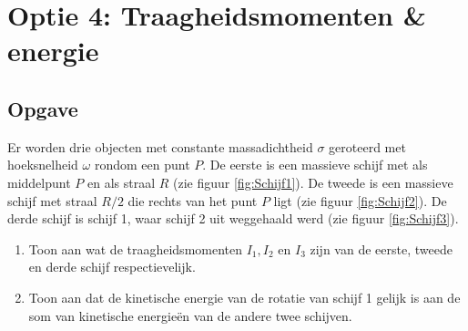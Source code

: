 \documentclass[a4paper,11pt]{article}
\begin{document}
\newpage
\section*{Optie 4: Traagheidsmomenten \& energie}
\subsection*{Opgave}
Er worden drie objecten met constante massadichtheid $\sigma$ geroteerd met hoeksnelheid $\omega$ rondom een punt $P$. De eerste is een massieve schijf met als middelpunt $P$ en als straal $R$ (zie figuur \ref{fig:Schijf1}). De tweede is een massieve schijf met straal $R/2$ die rechts van het punt $P$ ligt (zie figuur \ref{fig:Schijf2}). De derde schijf is schijf 1, waar schijf 2 uit weggehaald werd (zie figuur \ref{fig:Schijf3}).
\begin{enumerate}[label=(\alph*)]
	\item Toon aan wat de traagheidsmomenten $I_1,I_2$ en $I_3$ zijn van de eerste, tweede en derde schijf respectievelijk.
	\item Toon aan dat de kinetische energie van de rotatie van schijf 1 gelijk is aan de som van kinetische energie\"en van de andere twee schijven.
\end{enumerate}
\end{document}
